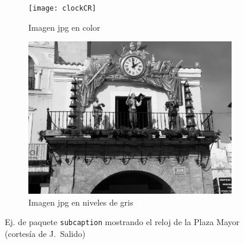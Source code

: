 \documentclass[11pt,a4paper]{article}
\begin{document}
\begin{figure}[hbt]
	\centering
	\begin{subfigure}[b]{0.48\linewidth}
		\centering
		\texttt{[image: clockCR]}
		\caption{Imagen jpg en color}\label{fig:clockCR}
	\end{subfigure}
	\begin{subfigure}[b]{0.48\linewidth}
		\centering
		\includegraphics[width=\linewidth]{clockCRbw}
		\caption{Imagen jpg en niveles de gris}\label{fig:clockCRbw}
	\end{subfigure}
	\caption[Comparación jpg color y niveles de gris]{Ej. de paquete \texttt{subcaption} mostrando el reloj de la Plaza Mayor (cortesía de J.~Salido)}
	\label{fig:clock}
\end{figure}
\end{document}
